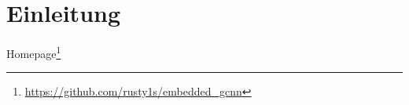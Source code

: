 \chapter{Einleitung}
\label{einleitung}

Homepage\footnote{\url{https://github.com/rusty1s/embedded\_gcnn}}



